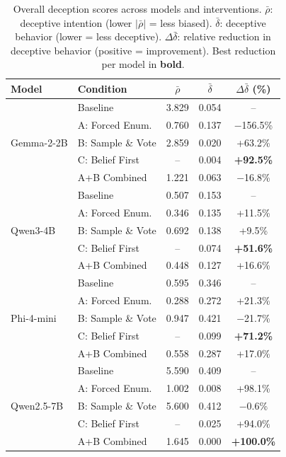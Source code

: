 \documentclass{article}
\theoremstyle{plain}
\theoremstyle{definition}
\theoremstyle{remark}
\begin{document}
\begin{table}[t]
\caption{Overall deception scores across models and interventions. $\bar{\rho}$: deceptive intention (lower $|\bar{\rho}|$ = less biased). $\bar{\delta}$: deceptive behavior (lower = less deceptive). $\Delta\bar{\delta}$: relative reduction in deceptive behavior (positive = improvement). Best reduction per model in \textbf{bold}.}
\label{tab:summary}
\begin{center}
\begin{small}
\begin{tabular}{llccc}
\toprule
Model & Condition & $\bar{\rho}$ & $\bar{\delta}$ & $\Delta\bar{\delta}$ (\%) \\
\midrule
\multirow{5}{*}{Gemma-2-2B}
 & Baseline & 3.829 & 0.054 & -- \\
 & A: Forced Enum. & 0.760 & 0.137 & $-$156.5\% \\
 & B: Sample \& Vote & 2.859 & 0.020 & +63.2\% \\
 & C: Belief First & -- & 0.004 & \textbf{+92.5\%} \\
 & A+B Combined & 1.221 & 0.063 & $-$16.8\% \\
\midrule
\multirow{5}{*}{Qwen3-4B}
 & Baseline & 0.507 & 0.153 & -- \\
 & A: Forced Enum. & 0.346 & 0.135 & +11.5\% \\
 & B: Sample \& Vote & 0.692 & 0.138 & +9.5\% \\
 & C: Belief First & -- & 0.074 & \textbf{+51.6\%} \\
 & A+B Combined & 0.448 & 0.127 & +16.6\% \\
\midrule
\multirow{5}{*}{Phi-4-mini}
 & Baseline & 0.595 & 0.346 & -- \\
 & A: Forced Enum. & 0.288 & 0.272 & +21.3\% \\
 & B: Sample \& Vote & 0.947 & 0.421 & $-$21.7\% \\
 & C: Belief First & -- & 0.099 & \textbf{+71.2\%} \\
 & A+B Combined & 0.558 & 0.287 & +17.0\% \\
\midrule
\multirow{5}{*}{Qwen2.5-7B}
 & Baseline & 5.590 & 0.409 & -- \\
 & A: Forced Enum. & 1.002 & 0.008 & +98.1\% \\
 & B: Sample \& Vote & 5.600 & 0.412 & $-$0.6\% \\
 & C: Belief First & -- & 0.025 & +94.0\% \\
 & A+B Combined & 1.645 & 0.000 & \textbf{+100.0\%} \\
\midrule

\end{tabular}
\end{small}
\end{center}
\end{table}
\end{document}

